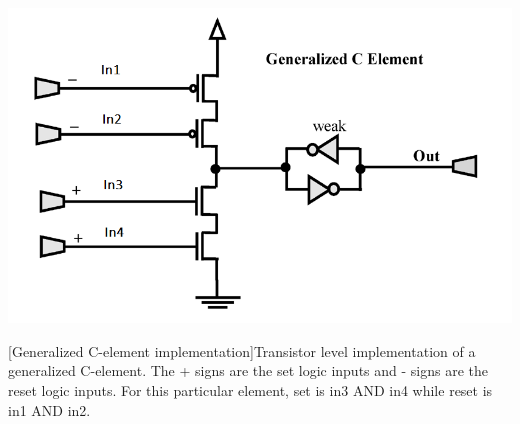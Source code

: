 \documentclass[12pt]{report}
\begin{document}
\begin{center}
\includegraphics[width=.7\textwidth]{genC}
\end{center}
[Generalized C-element implementation]{Transistor level implementation of a generalized C-element. The + signs are the set logic inputs and - signs are the reset logic inputs. For this particular element, set is in3 AND in4 while reset is in1 AND in2.}

\end{document}
